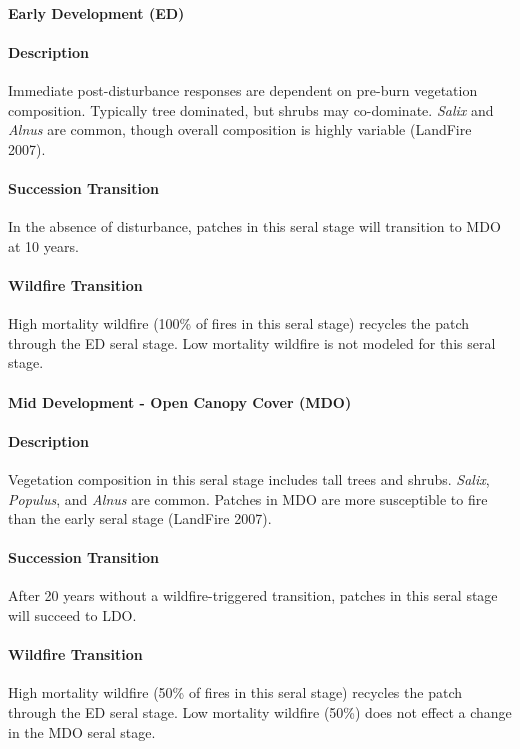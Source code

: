 \paragraph{Early Development (ED)}

\paragraph{Description} Immediate post-disturbance responses are dependent on pre-burn vegetation composition. Typically tree dominated, but shrubs may co-dominate. \emph{Salix} and \emph{Alnus} are common, though overall composition is highly variable (LandFire 2007).

\paragraph{Succession Transition} In the absence of disturbance, patches in this seral stage will transition to MDO at 10 years.

\paragraph{Wildfire Transition} High mortality wildfire (100\% of fires in this seral stage) recycles the patch through the ED seral stage. Low mortality wildfire is not modeled for this seral stage.

\hrulefill


\paragraph{Mid Development - Open Canopy Cover (MDO)}

\paragraph{Description} Vegetation composition in this seral stage includes tall trees and shrubs. \emph{Salix}, \emph{Populus}, and \emph{Alnus} are common. Patches in MDO are more susceptible to fire than the early seral stage (LandFire 2007).

\paragraph{Succession Transition} After 20 years without a wildfire-triggered transition, patches in this seral stage will succeed to LDO.

\paragraph{Wildfire Transition} High mortality wildfire (50\% of fires in this seral stage) recycles the patch through the ED seral stage. Low mortality wildfire (50\%) does not effect a change in the MDO seral stage.

